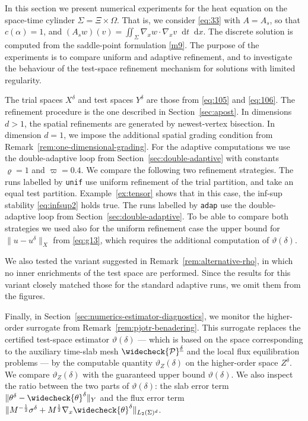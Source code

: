 \documentclass{amsart}
\numberwithin{equation}{section}
\newcommand{\1}{\mathbb 1}
\newcommand*\diff{\mathop{}\!\mathrm{d}}
\newcommand{\pria}{{\mathcal P}}
\begin{document}
In this section we present numerical experiments for the heat equation on the space-time cylinder $\Sigma=\Xi\times\Omega$. 
That is, we consider \eqref{eq:33} with $A=A_s$, so that $c(\alpha)=1$, and $(A_s w)(v)=\iint_\Sigma \nabla_x w \cdot \nabla_x v\diff t \diff x$. The discrete solution is computed from the saddle-point formulation \eqref{m9}. The purpose of the experiments is to compare uniform and adaptive refinement, and to investigate the behaviour of the test-space refinement mechanism for solutions with limited regularity.

The trial spaces $X^\delta$ and test spaces $Y^\delta$ are those from \eqref{eq:105} and \eqref{eq:106}. The refinement procedure is the one described in Section~\ref{sec:apost}. In dimensions $d>1$, the spatial refinements are generated by newest-vertex bisection. In dimension $d=1$, we impose the additional spatial grading condition from Remark~\ref{rem:one-dimensional-grading}. For the adaptive computations we use the double-adaptive loop from Section~\ref{sec:double-adaptive} with constants $\varrho=1$ and $\varpi = 0.4$.
We compare the following two refinement strategies. The runs labelled by \texttt{unif} use uniform refinement of the trial partition, and take an equal test partition. Example~\ref{ex:tensor} shows that in this case, the inf-sup stability \eqref{eq:infsup2} holds true. The runs labelled by \texttt{adap} use the double-adaptive loop from Section~\ref{sec:double-adaptive}.
To be able to compare both strategies we used also for the uniform refinement case the upper bound for $\|u-u^\delta\|_X$ from \eqref{eq:g13}, which requires the additional computation of $\vartheta(\delta)$.

We also tested the variant suggested in Remark~\ref{rem:alternative-rho}, in which no inner enrichments of the test space are performed. 
Since the results for this variant closely matched those for the standard adaptive runs, we omit them from the figures.

Finally, in Section~\ref{sec:numerics-estimator-diagnostics}, we monitor the higher-order surrogate from Remark~\ref{rem:pjotr-benadering}. This surrogate replaces the certified test-space estimator $\vartheta(\delta)$ --- which is based on the space corresponding to the auxiliary time-slab mesh $\widecheck\pria^{\underline\delta}$ and the local flux equilibration problems --- by the computable quantity $\vartheta_Z(\delta)$ on the higher-order space $Z^\delta$. We compare $\vartheta_Z(\delta)$ with the guaranteed upper bound $\vartheta(\delta)$. We also inspect the ratio between the two parts of $\vartheta(\delta)$: the slab error term $\|\theta^\delta - \widecheck{\theta}^\delta\|_Y$ and the flux error term $\|M^{-\frac{1}{2}}\sigma^\delta + M^{\frac{1}{2}}\nabla_x \widecheck{\theta}^\delta\|_{L_2(\Sigma)^d}$.
\end{document}
